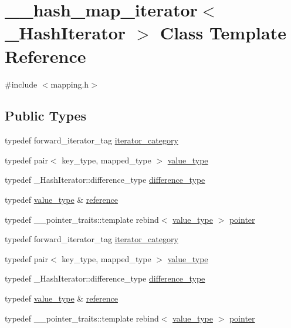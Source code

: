 \hypertarget{class____hash__map__iterator}{}\section{\+\_\+\+\_\+hash\+\_\+map\+\_\+iterator$<$ \+\_\+\+Hash\+Iterator $>$ Class Template Reference}
\label{class____hash__map__iterator}


{\ttfamily \#include $<$mapping.\+h$>$}

\subsection*{Public Types}
\begin{DoxyCompactItemize}
\item 
typedef forward\+\_\+iterator\+\_\+tag \hyperlink{class____hash__map__iterator_a82c25b4c3cbb1ea424ffae9832716982}{iterator\+\_\+category}
\item 
typedef pair$<$ key\+\_\+type, mapped\+\_\+type $>$ \hyperlink{class____hash__map__iterator_abffd0091a81decb8f5d64306e3dea5b8}{value\+\_\+type}
\item 
typedef \+\_\+\+Hash\+Iterator\+::difference\+\_\+type \hyperlink{class____hash__map__iterator_a2d6975541434b3c350bc11345210319a}{difference\+\_\+type}
\item 
typedef \hyperlink{class____hash__map__iterator_abffd0091a81decb8f5d64306e3dea5b8}{value\+\_\+type} \& \hyperlink{class____hash__map__iterator_a61a3f5fd8f3139155d5ceb11d125af3e}{reference}
\item 
typedef \+\_\+\+\_\+pointer\+\_\+traits\+::template rebind$<$ \hyperlink{class____hash__map__iterator_abffd0091a81decb8f5d64306e3dea5b8}{value\+\_\+type} $>$ \hyperlink{class____hash__map__iterator_a70e6b7226949cef63f92500927ca19a3}{pointer}
\item 
typedef forward\+\_\+iterator\+\_\+tag \hyperlink{class____hash__map__iterator_a82c25b4c3cbb1ea424ffae9832716982}{iterator\+\_\+category}
\item 
typedef pair$<$ key\+\_\+type, mapped\+\_\+type $>$ \hyperlink{class____hash__map__iterator_abffd0091a81decb8f5d64306e3dea5b8}{value\+\_\+type}
\item 
typedef \+\_\+\+Hash\+Iterator\+::difference\+\_\+type \hyperlink{class____hash__map__iterator_a2d6975541434b3c350bc11345210319a}{difference\+\_\+type}
\item 
typedef \hyperlink{class____hash__map__iterator_abffd0091a81decb8f5d64306e3dea5b8}{value\+\_\+type} \& \hyperlink{class____hash__map__iterator_a61a3f5fd8f3139155d5ceb11d125af3e}{reference}
\item 
typedef \+\_\+\+\_\+pointer\+\_\+traits\+::template rebind$<$ \hyperlink{class____hash__map__iterator_abffd0091a81decb8f5d64306e3dea5b8}{value\+\_\+type} $>$ \hyperlink{class____hash__map__iterator_a70e6b7226949cef63f92500927ca19a3}{pointer}
\end{DoxyCompactItemize}
